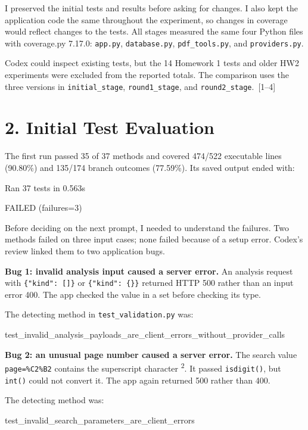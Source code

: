 \documentclass[10pt,letterpaper]{article}
\newcommand{\reportsection}[1]{\section*{\color{black}#1}}
\begin{document}
I preserved the initial tests and results before asking for changes. I also kept the application code the same throughout the experiment, so changes in coverage would reflect changes to the tests. All stages measured the same four Python files with coverage.py 7.17.0: \texttt{app.py}, \texttt{database.py}, \texttt{pdf\_tools.py}, and \texttt{providers.py}.

Codex could inspect existing tests, but the 14 Homework 1 tests and older HW2 experiments were excluded from the reported totals. The comparison uses the three versions in \texttt{initial\_stage}, \texttt{round1\_stage}, and \texttt{round2\_stage}.~[1--4]

\reportsection{2. Initial Test Evaluation}

The first run passed 35 of 37 methods and covered 474/522 executable lines (90.80\%) and 135/174 branch outcomes (77.59\%). Its saved output ended with:
\begin{reportcode}
Ran 37 tests in 0.563s

FAILED (failures=3)
\end{reportcode}

Before deciding on the next prompt, I needed to understand the failures. Two methods failed on three input cases; none failed because of a setup error. Codex's review linked them to two application bugs.

\textbf{Bug 1: invalid analysis input caused a server error.}
An analysis request with \texttt{\{"kind": []\}} or \texttt{\{"kind": \{\}\}} returned HTTP 500 rather than an input error 400. The app checked the value in a set before checking its type.

\begin{minipage}{\linewidth}
The detecting method in \texttt{test\_validation.py} was:
\begin{reportcode}
test_invalid_analysis_payloads_are_client_errors_without_provider_calls
\end{reportcode}
\end{minipage}

\textbf{Bug 2: an unusual page number caused a server error.}
The search value \texttt{page=\%C2\%B2} contains the superscript character \textsuperscript{2}. It passed \texttt{isdigit()}, but \texttt{int()} could not convert it. The app again returned 500 rather than 400.

\begin{minipage}{\linewidth}
The detecting method was:
\begin{reportcode}
test_invalid_search_parameters_are_client_errors
\end{reportcode}
\end{minipage}
\end{document}
